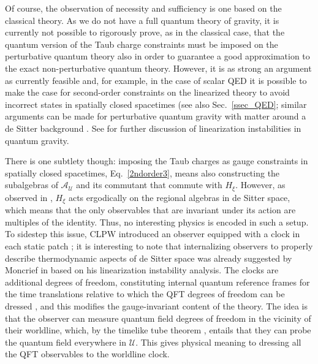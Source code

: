 \documentclass[]{jkpaper}
\theoremstyle{plain}
\theoremstyle{definition}
\begin{document}
Of course, the observation of necessity and sufficiency is one based on the classical theory. As we do not have a full quantum theory of gravity, it is currently not possible to rigorously prove, as in the classical case, that the quantum version of the Taub charge constraints must be imposed on the perturbative quantum theory also in order to guarantee a good approximation to the exact non-perturbative quantum theory. However, it is as strong an argument as currently feasible and, for example, in the case of scalar QED it is possible to make the case for second-order constraints on the linearized theory to avoid incorrect states in spatially closed spacetimes \cite[Sec.~6]{Higuchi:1991tk} (see also Sec.~\ref{ssec_QED}; similar arguments can be made for perturbative quantum gravity with matter around a de Sitter background \cite{Losic:2006ht}. See \cite{Moncrief:1978te,Moncrief:1979bg,Higuchi:1991tk,Higuchi:1991tm,Kaplan:2024xyk} for further discussion of linearization instabilities in quantum gravity.

There is one subtlety though: imposing the Taub charges as gauge constraints in spatially closed spacetimes, Eq.~\eqref{2ndorder3}, means also constructing the subalgebras of $\mathcal{A}_{\mathcal{U}}$ and its commutant that commute with $H_\xi$. However, as observed in \cite{Chandrasekaran:2022cip,Chen:2024rpx}, $H_\xi$ acts ergodically on the regional algebras in de Sitter space, which means that the only observables that are invariant under its action are multiples of the identity. Thus, no interesting physics is encoded in such a setup. To sidestep this issue, CLPW introduced an observer equipped with a clock in each static patch  \cite{Chandrasekaran:2022cip}; it is interesting to note that internalizing observers to properly describe thermodynamic aspects of de Sitter space was already suggested by Moncrief in \cite{Moncrief:1978te,Moncrief:1979bg} based on his linearization instability analysis. The clocks are additional degrees of freedom, constituting internal quantum reference frames \cite{Hoehn:2019fsy,delaHamette:2021oex,Hoehn:2023axh,Giacomini:2017zju,Carette:2023wpz} for the time translations relative to which the QFT degrees of freedom can be dressed \cite{DeVuyst:2024pop,Fewster:2024pur}, and this modifies the gauge-invariant content of the theory. The idea is that the observer can measure quantum field degrees of freedom in the vicinity of their worldline, which, by the timelike tube theorem \cite{Borchers1961,Araki1963AGO,Witten:2023qsv,Strohmaier:2023hhy,Strohmaier:2023opz}, entails that they can probe the quantum field everywhere in $\mathcal U$. This gives physical meaning to dressing all the QFT observables to the worldline clock.
\end{document}
